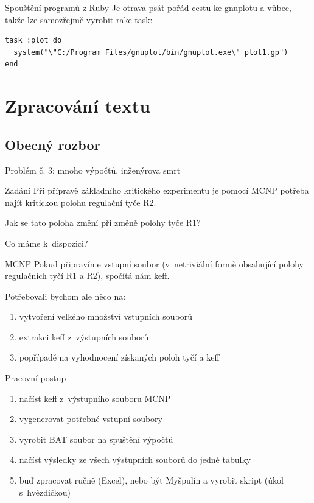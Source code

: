 \documentclass{beamer}
\begin{document}
\begin{frame}[fragile]{Spouštění programů z Ruby}
  Je otrava psát pořád cestu ke gnuplotu a vůbec, takže lze samozřejmě vyrobit rake task:
    \scriptsize
\begin{verbatim}
task :plot do
  system("\"C:/Program Files/gnuplot/bin/gnuplot.exe\" plot1.gp")
end
\end{verbatim}
\end{frame}

\section{Zpracování textu}

\subsection{Obecný rozbor}

\begin{frame}{Problém č. 3: mnoho výpočtů, inženýrova smrt}
  \begin{block}{Zadání}
    Při přípravě základního kritického experimentu je pomocí MCNP potřeba najít kritickou polohu regulační tyče R2.

    Jak se tato poloha změní při změně polohy tyče R1?
  \end{block}
\end{frame}

\begin{frame}{Co máme k~dispozici?}
  \begin{block}{MCNP}
    Pokud připravíme vstupní soubor (v~netriviální formě obsahující polohy regulačních tyčí R1 a R2), spočítá nám keff.
  \end{block}
  Potřebovali bychom ale něco na:
  \begin{enumerate}
    \item vytvoření velkého množství vstupních souborů
    \item extrakci keff z~výstupních souborů
    \item popřípadě na vyhodnocení získaných poloh tyčí a keff
  \end{enumerate}
\end{frame}

\begin{frame}{Pracovní postup}
  \begin{enumerate}
    \item načíst keff z~výstupního souboru MCNP
    \pause
    \item vygenerovat potřebné vstupní soubory
    \pause
    \item vyrobit BAT soubor na spuštění výpočtů
    \pause
    \item načíst výsledky ze všech výstupních souborů do jedné tabulky
    \pause
    \item buď zpracovat ručně (Excel), nebo být Myšpulín a vyrobit skript (úkol s~hvězdičkou)
  \end{enumerate}
\end{frame}
\end{document}
